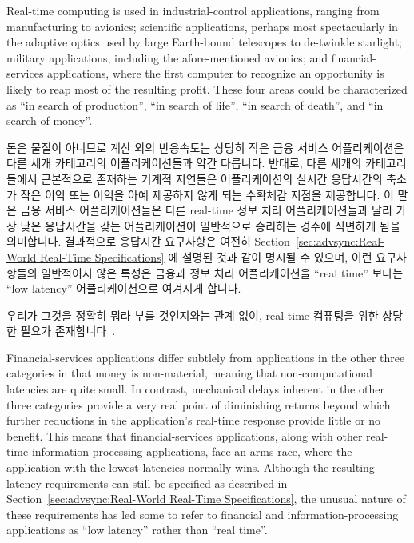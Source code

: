 Real-time computing is used in industrial-control applications, ranging from
manufacturing to avionics;
scientific applications, perhaps most spectacularly in the adaptive
optics used by
large Earth-bound telescopes to de-twinkle starlight;
military applications, including the afore-mentioned avionics;
and financial-services applications, where the first computer to recognize
an opportunity is likely to reap most of the resulting profit.
These four areas could be characterized as ``in search of production'',
``in search of life'', ``in search of death'', and ``in search of money''.
\fi

돈은 물질이 아니므로 계산 외의 반응속도는 상당히 작은 금융 서비스
어플리케이션은 다른 세개 카테고리의 어플리케이션들과 약간 다릅니다.
반대로, 다른 세개의 카테고리들에서 근본적으로 존재하는 기계적 지연들은
어플리케이션의 실시간 응답시간의 축소가 작은 이익 또는 이익을 아예 제공하지
않게 되는 수확체감 지점을 제공합니다.
이 말은 금융 서비스 어플리케이션들은 다른 real-time 정보 처리 어플리케이션들과
달리 가장 낮은 응답시간을 갖는 어플리케이션이 일반적으로 승리하는 경주에
직면하게 됨을 의미합니다.
결과적으로 응답시간 요구사항은 여전히
Section~\ref{sec:advsync:Real-World Real-Time Specifications} 에 설명된 것과
같이 명시될 수 있으며, 이런 요구사항들의 일반적이지 않은 특성은 금융과 정보
처리 어플리케이션을 ``real time'' 보다는 ``low latency'' 어플리케이션으로
여겨지게 합니다.

우리가 그것을 정확히 뭐라 부를 것인지와는 관계 없이, real-time 컴퓨팅을 위한
상당한 필요가 존재합니다~\cite{JeremyWPeters2006NYTDec11,BillInmon2007a}.
\iffalse

Financial-services applications differ subtlely from applications in
the other three categories in that money is non-material, meaning that
non-computational latencies are quite small.
In contrast, mechanical delays inherent in the other three categories
provide a very real point of diminishing returns beyond which further
reductions in the application's real-time response provide little or
no benefit.
This means that financial-services applications, along with other
real-time information-processing applications, face an arms race,
where the application with the lowest latencies normally wins.
Although the resulting latency requirements can still be specified
as described in
Section~\ref{sec:advsync:Real-World Real-Time Specifications},
the unusual nature of these requirements has led some to refer to
financial and information-processing applications as ``low latency''
rather than ``real time''.

